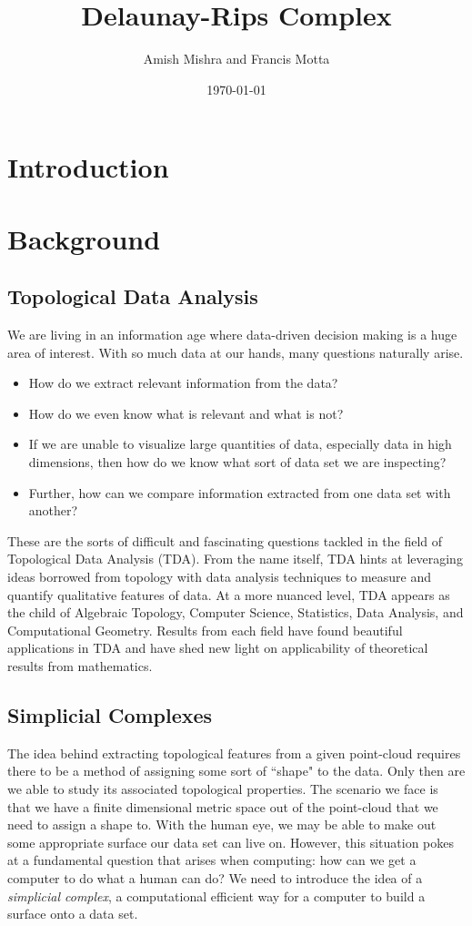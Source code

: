 \documentclass[letterpaper,titlepage]{article}
\title{Delaunay-Rips Complex}
\author{Amish Mishra and Francis Motta}
\date{\today}
\begin{document}
\maketitle

\section{Introduction}


\section{Background}

\subsection{Topological Data Analysis}
    We are living in an information age where data-driven decision making is a huge area of interest. With so much data at our hands, many questions naturally arise.
    \begin{itemize}
        \item How do we extract relevant information from the data? \item How do we even know what is relevant and what is not? 
        \item If we are unable to visualize large quantities of data, especially data in high dimensions, then how do we know what sort of data set we are inspecting? 
        \item Further, how can we compare information extracted from one data set with another?
    \end{itemize}
    These are the sorts of difficult and fascinating questions tackled in the field of Topological Data Analysis (TDA). From the name itself, TDA hints at leveraging ideas borrowed from topology with data analysis techniques to measure and quantify qualitative features of data. At a more nuanced level, TDA appears as the child of Algebraic Topology, Computer Science, Statistics, Data Analysis, and Computational Geometry. Results from each field have found beautiful applications in TDA and have shed new light on applicability of theoretical results from mathematics.
    
    
\subsection{Simplicial Complexes}
    The idea behind extracting topological features from a given point-cloud requires there to be a method of assigning some sort of ``shape" to the data. Only then are we able to study its associated topological properties. The scenario we face is that we have a finite dimensional metric space out of the point-cloud that we need to assign a shape to. With the human eye, we may be able to make out some appropriate surface our data set can live on. However, this situation pokes at a fundamental question that arises when computing: how can we get a computer to do what a human can do? We need to introduce the idea of a \textit{simplicial complex}, a computational efficient way for a computer to build a surface onto a data set.
    
\end{document}
